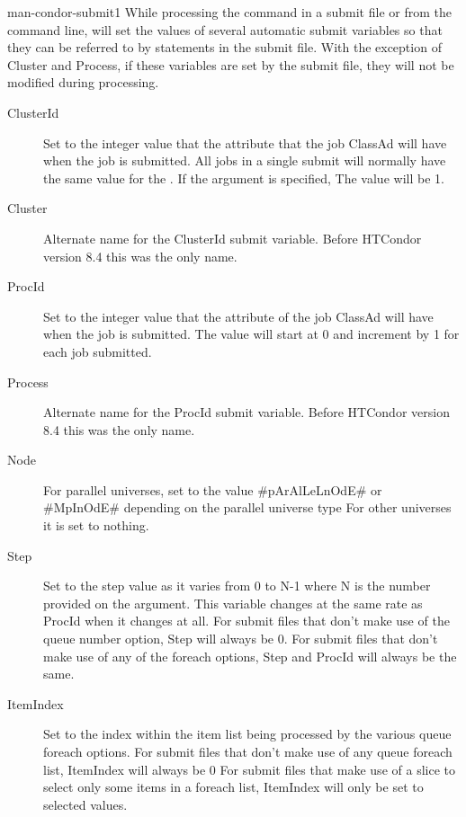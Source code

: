 \begin{ManPage}{}{man-condor-submit}{1}
While processing the  command in a submit file or from the command line,  will
set the values of several automatic submit variables so that they can be referred to by statements in the
submit file. With the exception of Cluster and Process, if these variables are set by the submit file, they will
not be modified during  processing.

\begin{description}
\item[ClusterId]
Set to the integer value that the  attribute that the job ClassAd will have when the job is submitted.
All jobs in a single submit will normally have the same value for the .
If the  argument is specified, The value will be 1.

\item[Cluster]
Alternate name for the ClusterId submit variable.  Before HTCondor version 8.4 this was the only name.

\item[ProcId]
Set to the integer value that the  attribute of the job ClassAd will have when the job is submitted.
The value will start at 0 and increment by 1 for each job submitted.

\item[Process]
Alternate name for the ProcId submit variable.  Before HTCondor version 8.4 this was the only name.

\item[Node]
For parallel universes, set to the value \#pArAlLeLnOdE\# or \#MpInOdE\# depending on the parallel universe type
For other universes it is set to nothing.

\item[Step]
Set to the step value as it varies from 0 to N-1 where N is the number provided on the  argument.
This variable changes at the same rate as ProcId when it changes at all.
For submit files that don't make use of the queue number option, Step will always be 0.
For submit files that don't make use of any of the foreach options, Step and ProcId will always be the same.

\item[ItemIndex]
Set to the index within the item list being processed by the various queue foreach options.
For submit files that don't make use of any queue foreach list, ItemIndex will always be 0
For submit files that make use of a slice to select only some items in a foreach list, ItemIndex will only
be set to selected values.


\end{description}
\end{ManPage}
